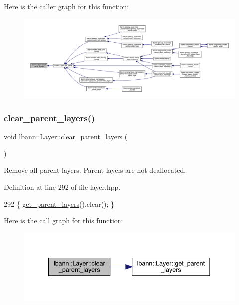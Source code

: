 Here is the caller graph for this function\+:\nopagebreak
\begin{figure}[H]
\begin{center}
\leavevmode
\includegraphics[width=350pt]{classlbann_1_1Layer_aa1389a70b804debaac6953b3b1147593_icgraph}
\end{center}
\end{figure}
\mbox{\label{classlbann_1_1Layer_a7336909c78e438ba5332c6c1bddeadd2}} 
\subsubsection{\texorpdfstring{clear\+\_\+parent\+\_\+layers()}{clear\_parent\_layers()}}
{\footnotesize\ttfamily void lbann\+::\+Layer\+::clear\+\_\+parent\+\_\+layers (\begin{DoxyParamCaption}{ }\end{DoxyParamCaption})\hspace{0.3cm}{\ttfamily [inline]}}

Remove all parent layers. Parent layers are not deallocated. 

Definition at line 292 of file layer.\+hpp.


\begin{DoxyCode}
292 \{ \hyperlink{classlbann_1_1Layer_a898e72b93752abf52d35b06459cd360e}{get\_parent\_layers}().clear(); \}
\end{DoxyCode}
Here is the call graph for this function\+:\nopagebreak
\begin{figure}[H]
\begin{center}
\leavevmode
\includegraphics[width=339pt]{classlbann_1_1Layer_a7336909c78e438ba5332c6c1bddeadd2_cgraph}
\end{center}
\end{figure}
\mbox{\label{classlbann_1_1Layer_af420f22bbac801c85483ade84588a23f}} 
